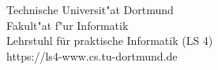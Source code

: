\begin{titlepage}
\vspace*{2.5cm}
\hspace*{\links}
\begin{minipage}[b]{8cm}
\raggedright
Technische Universit"at Dortmund \\
Fakult"at f"ur Informatik\\
Lehrstuhl für praktische Informatik (LS 4)\\
https://ls4-www.cs.tu-dortmund.de
\end{minipage}

\end{titlepage}
